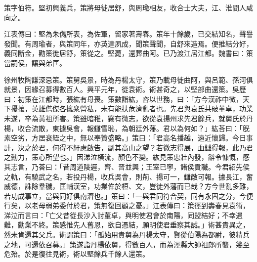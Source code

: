 
\begin{pinyinscope}
策字伯符。堅初興義兵，策將母徙居舒，與周瑜相友，收合士大夫，江、淮間人咸向之。

江表傳曰：堅為朱儁所表，為佐軍，留家著壽春。策年十餘歲，已交結知名，聲譽發聞。有周瑜者，與策同年，亦英達夙成，聞策聲聞，自舒來造焉。便推結分好，義同斷金，勸策徙居舒，策從之。堅薨，還葬曲阿。已乃渡江居江都。魏書曰：策當嗣侯，讓與弟匡。

徐州牧陶謙深忌策。策舅吳景，時為丹楊太守，策乃載母徙曲阿，與呂範、孫河俱就景，因緣召募得數百人。興平元年，從袁術。術甚奇之，以堅部曲還策。吳歷曰：初策在江都時，張紘有母喪。策數詣紘，咨以世務，曰：「方今漢祚中微，天下擾攘，英雄儁傑各擁衆營私，未有能扶危濟亂者也。先君與袁氏共破董卓，功業未遂，卒為黃祖所害。策雖暗稚，竊有微志，欲從袁揚州求先君餘兵，就舅氏於丹楊，收合流散，東據吳會，報讎雪恥，為朝廷外藩。君以為何如？」紘荅曰：「旣素空劣，方居衰絰之中，無以奉贊盛略。」策曰：「君高名播越，遠近懷歸。今日事計，決之於君，何得不紆慮啟告，副其高山之望？若微志得展，血讎得報，此乃君之勳力，策心所望也。」因涕泣橫流，顏色不變。紘見策忠壯內發，辭令慷慨，感其志言，乃荅曰：「昔周道陵遲，齊、晉並興；王室已寧，諸侯貢職。今君紹先侯之軌，有驍武之名，若投丹楊，收兵吳會，則荊、揚可一，讎敵可報。據長江，奮威德，誅除羣穢，匡輔漢室，功業侔於桓、文，豈徒外藩而已哉？方今世亂多難，若功成事立，當與同好俱南濟也。」策曰：「一與君同符合契，同有永固之分，今便行矣，以老母弱弟委付於君，策無復回顧之憂。」江表傳曰：策徑到壽春見袁術，涕泣而言曰：「亡父昔從長沙入討董卓，與明使君會於南陽，同盟結好；不幸遇難，勳業不終。策感惟先人舊恩，欲自憑結，願明使君垂察其誠。」術甚貴異之，然未肯還其父兵。術謂策曰：「孤始用貴舅為丹楊太守，賢從伯陽為都尉，彼精兵之地，可還依召募。」策遂詣丹楊依舅，得數百人，而為涇縣大帥祖郎所襲，幾至危殆。於是復往見術，術以堅餘兵千餘人還策。


\end{pinyinscope}
